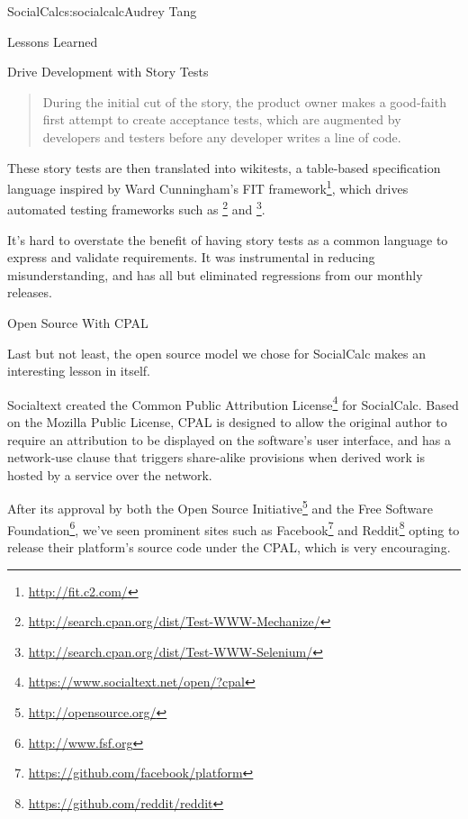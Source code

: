 \begin{aosachapter}{SocialCalc}{s:socialcalc}{Audrey Tang}
\begin{aosasect1}{Lessons Learned}
\begin{aosasect2}{Drive Development with Story Tests}
\begin{quotation}
  During the initial cut of the story, the product owner makes a
  good-faith first attempt to create acceptance tests, which are
  augmented by developers and testers before any developer writes
  a line of code.

\end{quotation}

These story tests are then translated into wikitests, a table-based
specification language inspired by Ward Cunningham's FIT
framework\footnote{\url{http://fit.c2.com/}}, which drives automated
testing frameworks such as
\footnote{\url{http://search.cpan.org/dist/Test-WWW-Mechanize/}}
and
\footnote{\url{http://search.cpan.org/dist/Test-WWW-Selenium/}}.

It's hard to overstate the benefit of having story tests as a common
language to express and validate requirements. It was instrumental in
reducing misunderstanding, and has all but eliminated regressions from
our monthly releases.

\end{aosasect2}


\begin{aosasect2}{Open Source With CPAL}

Last but not least, the open source model we chose for SocialCalc
makes an interesting lesson in itself.


Socialtext created the Common Public Attribution
License\footnote{\url{https://www.socialtext.net/open/?cpal}} for
SocialCalc.  Based on the Mozilla Public License, CPAL is designed to
allow the original author to require an attribution to be displayed
on the software's user interface, and has a network-use clause that
triggers share-alike provisions when derived work is hosted by a
service over the network.


After its approval by both the Open Source
Initiative\footnote{\url{http://opensource.org/}} and the Free
Software Foundation\footnote{\url{http://www.fsf.org}}, we've seen prominent
sites such as Facebook\footnote{\url{https://github.com/facebook/platform}}
and Reddit\footnote{\url{https://github.com/reddit/reddit}} opting to release
their platform's source code under the CPAL, which is very
encouraging.



\end{aosasect2}
\end{aosasect1}
\end{aosachapter}
